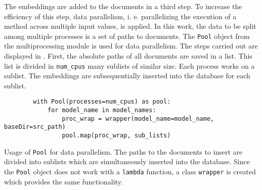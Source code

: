 
The embeddings are added to the documents in a third step.
To increase the efficiency of this step, data parallelism, i. e. parallelizing the execution of a method across multiple input values, is applied.
In this work, the data to be split among multiple processes is a set of paths to documents.
The \texttt{Pool} object from the multiprocessing module is used for data parallelism.
The steps carried out are displayed in .
First, the absolute paths of all documents are saved in a list.
This list is divided in \texttt{num\_cpus} many sublists of similar size.
Each process works on a sublist.
The embeddings are subsequentially inserted into the database for each sublist. 

\begin{listing}[htp]
    \begin{verbatim}
        with Pool(processes=num_cpus) as pool:
            for model_name in model_names:
                proc_wrap = wrapper(model_name=model_name, baseDir=src_path)
                pool.map(proc_wrap, sub_lists)
    \end{verbatim}
    \caption[Usage of \texttt{Pool} for data parallelism]
    {Usage of \texttt{Pool} for data parallelism.
    The paths to the documents to insert are divided into sublists which are simultaneously inserted into the database.
    Since the \texttt{Pool} object does not work with a \texttt{lambda} function, 
    a class \texttt{wrapper} is created which provides the same functionality.
    }
    \label{lst:db_Pool_embeddings}
\end{listing}

